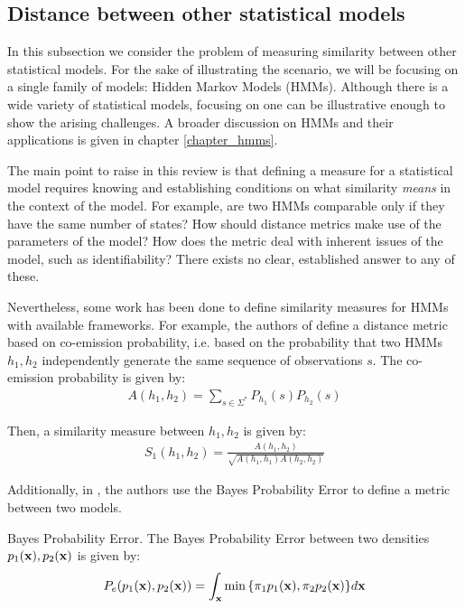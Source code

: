 \documentclass[../main.tex]{subfiles}
\begin{document}
\subsection{Distance between other statistical models}\label{subsection_models}
In this subsection we consider the problem of measuring similarity between other statistical models. For the sake of illustrating the scenario, we will be focusing on a single family of models: Hidden Markov Models (HMMs). Although there is a wide variety of statistical models, focusing on one can be illustrative enough to show the arising challenges. A broader discussion on HMMs and their applications is given in chapter \ref{chapter_hmms}.
\par The main point to raise in this review is that defining a measure for a statistical model requires knowing and establishing conditions on what similarity \emph{means} in the context of the model. For example, are two HMMs comparable only if they have the same number of states? How should distance metrics make use of the parameters of the model? How does the metric deal with inherent issues of the model, such as identifiability? There exists no clear, established answer to any of these.
\par Nevertheless, some work has been done to define similarity measures for HMMs with available frameworks. For example, the authors of \cite{Lyngs1999} define a distance metric based on co-emission probability, i.e. based on the probability that two HMMs $h_1, h_2$ independently generate the same sequence of observations $s$. The co-emission probability is given by:
\begin{align*}
A(h_1, h_2) = \sum_{s\in \Sigma^*}P_{h_1}(s)P_{h_2}(s)
\end{align*}
\par Then, a similarity measure between $h_1, h_2$ is given by:
\begin{align*}
S_1(h_1, h_2) = \frac{A(h_1, h_2)}{\sqrt{A(h_1, h_1)A(h_2, h_2)}}
\end{align*}
\par Additionally, in \cite{Bahlmann2001}, the authors use the Bayes Probability Error to define a metric between two models. 
\begin{definition}{Bayes Probability Error.} \label{def_bpe}
The Bayes Probability Error between two densities $p_1(\mathbf{x}), p_2(\mathbf{x})$ is given by:
\begin{align*}
P_e(p_1(\mathbf{x}), p_2(\mathbf{x})) = \int_{\mathbf{x}}\min{\{\pi_1p_1(\mathbf{x}), \pi_2p_2(\mathbf{x})\}}d\mathbf{x}
\end{align*}
\end{definition}
\end{document}
